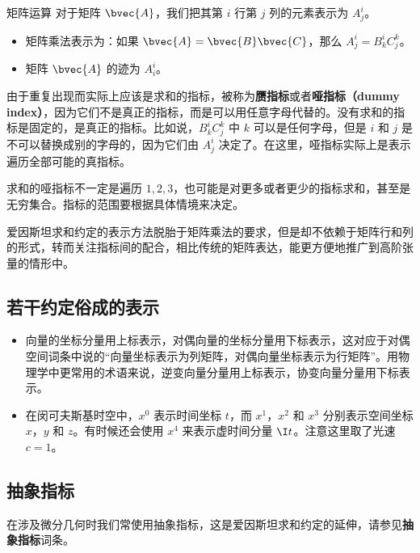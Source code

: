 \begin{example}{矩阵运算}
对于矩阵 $\bvec{A}$，我们把其第 $i$ 行第 $j$ 列的元素表示为 $A^i_j$。
\begin{itemize}
\item 矩阵乘法表示为：如果 $\bvec{A}=\bvec{B}\bvec{C}$，那么 $A^i_j=B^i_k C^k_j$。
\item 矩阵 $\bvec{A}$ 的迹为 $A^i_i$。

\end{itemize}
\end{example}

由于重复出现而实际上应该是求和的指标，被称为\textbf{赝指标}或者\textbf{哑指标（dummy index）}，因为它们不是真正的指标，而是可以用任意字母代替的。没有求和的指标是固定的，是真正的指标。比如说，$B^i_k C^k_j$ 中 $k$ 可以是任何字母，但是 $i$ 和 $j$ 是不可以替换成别的字母的，因为它们由 $A^i_j$ 决定了。在这里，哑指标实际上是表示遍历全部可能的真指标。

求和的哑指标不一定是遍历 $1, 2, 3$，也可能是对更多或者更少的指标求和，甚至是无穷集合。指标的范围要根据具体情境来决定。

爱因斯坦求和约定的表示方法脱胎于矩阵乘法的要求，但是却不依赖于矩阵行和列的形式，转而关注指标间的配合，相比传统的矩阵表达，能更方便地推广到高阶张量的情形中。


\subsection{若干约定俗成的表示}
\begin{itemize}
\item 向量的坐标分量用上标表示，对偶向量的坐标分量用下标表示，这对应于对偶空间词条中说的“向量坐标表示为列矩阵，对偶向量坐标表示为行矩阵”。用物理学中更常用的术语来说，逆变向量分量用上标表示，协变向量分量用下标表示。

\item 在闵可夫斯基时空中，$x^0$ 表示时间坐标 $t$，而 $x^1$，$x^2$ 和 $x^3$ 分别表示空间坐标 $x$，$y$ 和 $z$。有时候还会使用 $x^4$ 来表示虚时间分量 $\I t$。注意这里取了光速 $c=1$。




\end{itemize}







\subsection{抽象指标}

在涉及微分几何时我们常使用抽象指标，这是爱因斯坦求和约定的延伸，请参见\textbf{抽象指标}词条。




